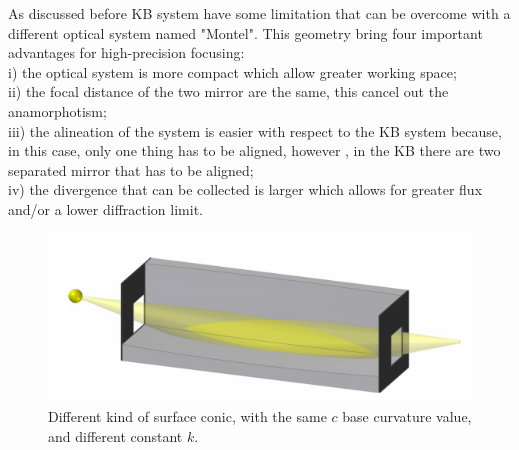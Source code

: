 \hspace{10mm} As discussed before KB system have some limitation that can be overcome with a different optical system named "Montel". This geometry bring four important advantages for high-precision focusing: 
\\ i) the optical system is more compact which allow greater working space;
\\ ii) the focal distance of the two mirror are the same, this cancel out  the anamorphotism;
\\ iii) the alineation of the system is easier with respect to the KB system because, in this case, only one thing has to be aligned, however , in the KB there are two separated mirror that has to be aligned;
\\ iv) the divergence that can be collected is larger which allows for greater flux and/or a lower diffraction limit.
\begin{figure}[H]
%
\centering
%
\includegraphics[width=.6\textwidth]{Immagini/Chapter2/MontelSystem}
%
\caption{Different kind of surface conic, with the same $c $ base curvature value, and different constant $k $.}
%
\label{fig: SurfaceConic1}
%
\end{figure}

